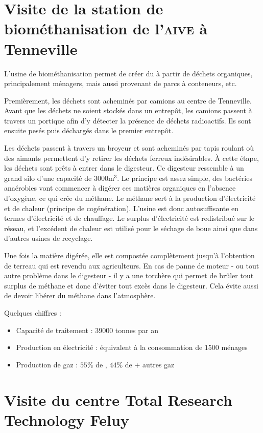 \section{Visite de la station de biométhanisation de l’\textsc{aive} à Tenneville}

L’usine de biométhanisation permet de créer du  à partir de déchets organiques,
principalement ménagers, mais aussi provenant de parcs à conteneurs, etc.

Premièrement, les déchets sont acheminés par camions au centre de Tenneville.
Avant que les déchets ne soient stockés dans un entrepôt, 
les camions passent à travers un portique afin 
d'y détecter la présence de déchets radioactifs. Ils sont ensuite pesés
puis déchargés dans le premier entrepôt.

Les déchets passent à travers un broyeur et sont acheminés par tapis roulant 
où des aimants permettent d’y retirer les déchets ferreux indésirables.
À cette étape, les déchets sont prêts à entrer dans le digesteur. 
Ce digesteur ressemble à un grand silo d’une capacité de $3000 \si{\meter\cubed}$.
Le principe est assez simple, des bactéries anaérobies vont commencer à digérer 
ces matières organiques en l’absence d’oxygène, ce qui crée du méthane. 
Le méthane sert à la production d’électricité et de chaleur (principe de cogénération).
L’usine est donc autosuffisante en termes d'électricité et de chauffage.
Le surplus  d’électricité est redistribué sur le réseau, et l’excédent de chaleur 
est utilisé pour le séchage de boue ainsi que dans d’autres usines de recyclage. 

Une fois la matière digérée, elle est compostée complètement jusqu’à l’obtention 
de terreau qui est revendu aux agriculteurs.
En cas de panne de moteur - ou tout autre problème dans le digesteur -
il y a une torchère qui permet de brûler tout surplus de méthane
et donc d'éviter tout excès dans le digesteur. Cela évite aussi de devoir 
libérer du méthane dans l’atmosphère.

Quelques chiffres :
\begin{itemize}
	\item Capacité de traitement : $39 000$ tonnes par an
	\item Production en électricité : équivalent à la consommation de $1500$ ménages
	\item Production de gaz : $55\%$ de , $44\%$ de  + autres gaz
\end{itemize}

\section{Visite du centre Total Research Technology Feluy}

